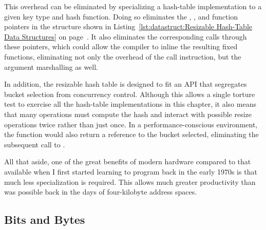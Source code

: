 This overhead can be eliminated by specializing a hash-table implementation
to a given key type and hash function.
Doing so eliminates the , , and
 function pointers in the  structure shown in
Listing~\ref{lst:datastruct:Resizable Hash-Table Data Structures} on
page~\pageref{lst:datastruct:Resizable Hash-Table Data Structures}.
It also eliminates the corresponding calls through these pointers,
which could allow the compiler to inline the resulting fixed functions,
eliminating not only the overhead of the call instruction, but the
argument marshalling as well.

In addition, the resizable hash table is designed to fit an API
that segregates bucket selection from concurrency control.
Although this allows a single torture test to exercise all the hash-table
implementations in this chapter, it also means that many operations
must compute the hash and interact with possible resize operations twice
rather than just once.
In a performance-conscious environment, the 
function would also return a reference to the bucket selected, eliminating
the subsequent call to .


All that aside, one of the great benefits of modern hardware compared
to that available when I first started learning to program back in
the early 1970s is that much less specialization is required.
This allows much greater productivity than was possible back in the
days of four-kilobyte address spaces.

\subsection{Bits and Bytes}
\label{sec:datastruct:Bits and Bytes}

